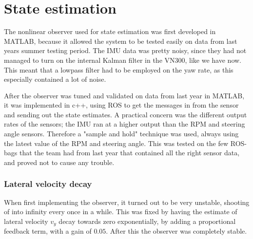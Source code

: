 \section{State estimation}

The nonlinear observer used for state estimation was first developed in MATLAB, because it allowed the system to be tested easily on data from last years summer testing period. The \gls{IMU} data was pretty noisy, since they had not managed to turn on the internal Kalman filter in the VN300, like we have now. This meant that a lowpass filter had to be employed on the yaw rate, as this especially contained a lot of noise. 

After the observer was tuned and validated on data from last year in MATLAB, it was implemented in c++, using \gls{ROS} to get the messages in from the sensor and sending out the state estimates. A practical concern was the different output rates of the sensors; the \gls{IMU} ran at a higher output than the \gls{RPM} and steering angle sensors. Therefore a "sample and hold" technique was used, always using the latest value of the \gls{RPM} and steering angle. This was tested on the few \gls{ROS}-bags that the team had from last year that contained all the right sensor data, and proved not to cause any trouble.  

\subsubsection{Lateral velocity decay}

When first implementing the observer, it turned out to be very unstable, shooting of into infinity every once in a while. This was fixed by having the estimate of lateral velocity $v_y$ decay towards zero exponentially, by adding a proportional feedback term, with a gain of $0.05$. After this the observer was completely stable.